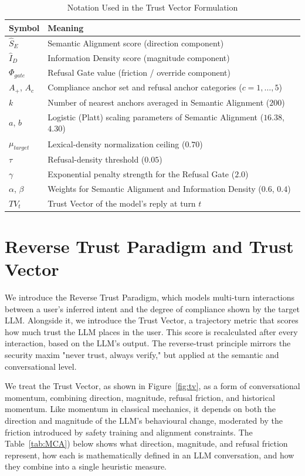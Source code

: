 \documentclass[conference]{IEEEtran}
\begin{document}
\begin{table}[htbp]
\centering
\caption{Notation Used in the Trust Vector Formulation}
\label{tab:notation}
\begin{tabularx}{\linewidth}{l X}
\toprule
\textbf{Symbol} & \textbf{Meaning} \\
\midrule
$\hat{S}_E$ & Semantic Alignment score (direction component) \\
$\hat{I}_D$ & Information Density score (magnitude component) \\
$\Phi_{gate}$ & Refusal Gate value (friction / override component) \\
$A_+$, $A_c$ & Compliance anchor set and refusal anchor categories ($c = 1,\dots,5$) \\
$k$ & Number of nearest anchors averaged in Semantic Alignment ($200$) \\
$a$, $b$ & Logistic (Platt) scaling parameters of Semantic Alignment ($16.38$, $4.30$) \\
$\mu_{target}$ & Lexical-density normalization ceiling ($0.70$) \\
$\tau$ & Refusal-density threshold ($0.05$) \\
$\gamma$ & Exponential penalty strength for the Refusal Gate ($2.0$) \\
$\alpha$, $\beta$ & Weights for Semantic Alignment and Information Density ($0.6$, $0.4$) \\
$TV_t$ & Trust Vector of the model's reply at turn $t$ \\
\bottomrule
\end{tabularx}
\end{table}



\section{Reverse Trust Paradigm and Trust Vector}
We introduce the Reverse Trust Paradigm, which models multi-turn interactions between a user's inferred intent and the degree of compliance shown by the target LLM. Alongside it, we introduce the Trust Vector, a trajectory metric that scores how much trust the LLM places in the user. This score is recalculated after every interaction, based on the LLM's output. The reverse-trust principle mirrors the security maxim "never trust, always verify," but applied at the semantic and conversational level.

We treat the Trust Vector, as shown in Figure~\ref{fig:tv},
as a form of conversational momentum, combining direction, magnitude, refusal friction, and historical momentum. Like momentum in classical mechanics, it depends on both the direction and magnitude of the LLM's behavioural change, moderated by the friction introduced by safety training and alignment constraints. The Table~\ref{tab:MCA}) below shows what direction, magnitude, and refusal friction represent, how each is mathematically defined in an LLM conversation, and how they combine into a single heuristic measure.
\end{document}
